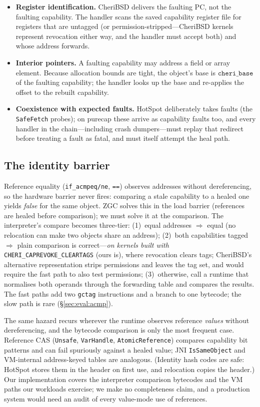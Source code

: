\documentclass[acmsmall,nonacm,screen]{acmart}
\begin{document}
\begin{itemize}
\item \textbf{Register identification.} CheriBSD delivers the faulting
  PC, not the faulting capability. The handler scans the saved
  capability register file for registers that are untagged (or
  permission-stripped---CheriBSD kernels represent revocation either
  way, and the handler must accept both) and whose address forwards.
\item \textbf{Interior pointers.} A faulting capability may address a
  field or array element. Because allocation bounds are tight, the
  object's base is $\texttt{cheri\_base}$ of the faulting capability;
  the handler looks up the base and re-applies the offset to the
  rebuilt capability.
\item \textbf{Coexistence with expected faults.} HotSpot deliberately
  takes faults (the \texttt{SafeFetch} probes); on purecap these arrive
  as capability faults too, and every handler in the chain---including
  crash dumpers---must replay that redirect before treating a fault as
  fatal, and must itself attempt the heal path.
\end{itemize}

\subsection{The identity barrier}
\label{sec:design:acmp}

Reference equality (\texttt{if\_acmpeq/ne}, \texttt{==}) observes
addresses without dereferencing, so the hardware barrier never fires: comparing a stale capability to a healed
one yields \emph{false} for the same object. ZGC solves this in the
load barrier (references are healed before comparison); we must solve
it at the comparison. The interpreter's compare becomes three-tier:
(1)~equal addresses $\Rightarrow$ equal (no relocation can make two
objects share an address); (2)~both capabilities tagged $\Rightarrow$
plain comparison is correct---\emph{on kernels built with}
\texttt{CHERI\_CAPREVOKE\_CLEARTAGS} (ours is), where revocation
clears tags; CheriBSD's alternative representation strips permissions
and leaves the tag set, and would require the fast path to also test
permissions; (3)~otherwise, call a runtime that normalises both
operands through the forwarding table and compares the results. The fast paths
add two \texttt{gctag} instructions and a branch to one bytecode; the
slow path is rare (\S\ref{sec:eval:acmp}).

The same hazard recurs wherever the runtime observes reference
\emph{values} without dereferencing, and the bytecode comparison is
only the most frequent case. Reference CAS (\texttt{Unsafe},
\texttt{VarHandle}, \texttt{AtomicReference})
compares capability bit patterns and can fail spuriously against a
healed value; JNI \texttt{IsSameObject} and VM-internal address-keyed
tables are analogous. (Identity hash codes are safe: HotSpot stores
them in the header on first use, and relocation copies the header.) Our
implementation covers the interpreter comparison bytecodes and the VM
paths our workloads exercise; we make no completeness claim, and a
production system would need an audit of every value-mode use of
references.
\end{document}
